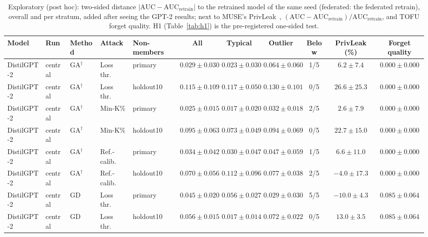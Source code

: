 \begin{table}[t]
\centering
\caption{Exploratory (post hoc): two-sided distance $|\mathrm{AUC}-\mathrm{AUC}_{\mathrm{retrain}}|$ to the retrained model of the same seed (federated: the federated retrain), overall and per stratum, added after seeing the GPT-2 results; next to MUSE's PrivLeak~\cite{shi2024muse}, $(\mathrm{AUC}-\mathrm{AUC}_{\mathrm{retrain}})/\mathrm{AUC}_{\mathrm{retrain}}$, and TOFU forget quality. H1 (Table~\ref{tab:h1}) is the pre-registered one-sided test.}
\label{tab:h1-two-sided}
\footnotesize
\renewcommand{\arraystretch}{1.2}
\setlength{\tabcolsep}{2pt}
\begin{tabular*}{\textwidth}{@{\extracolsep{\fill}}lllllcccccc@{}}
\toprule
\textbf{Model} & \textbf{Run} & \textbf{Method} & \textbf{Attack} & \textbf{Non-members} & \textbf{All} & \textbf{Typical} & \textbf{Outlier} & \textbf{Below} & \textbf{PrivLeak (\%)} & \textbf{Forget quality} \\
\midrule
DistilGPT-2 & central & GA$^{\dagger}$ & Loss thr. & primary & $0.029 \pm 0.030$ & $0.023 \pm 0.030$ & $0.064 \pm 0.060$ & 1/5 & $6.2 \pm 7.4$ & $0.000 \pm 0.000$ \\
DistilGPT-2 & central & GA$^{\dagger}$ & Loss thr. & holdout10 & $0.115 \pm 0.109$ & $0.117 \pm 0.050$ & $0.130 \pm 0.101$ & 0/5 & $26.6 \pm 25.3$ & $0.000 \pm 0.000$ \\
DistilGPT-2 & central & GA$^{\dagger}$ & Min-K\% & primary & $0.025 \pm 0.015$ & $0.017 \pm 0.020$ & $0.032 \pm 0.018$ & 2/5 & $2.6 \pm 7.9$ & $0.000 \pm 0.000$ \\
DistilGPT-2 & central & GA$^{\dagger}$ & Min-K\% & holdout10 & $0.095 \pm 0.063$ & $0.073 \pm 0.049$ & $0.094 \pm 0.069$ & 0/5 & $22.7 \pm 15.0$ & $0.000 \pm 0.000$ \\
DistilGPT-2 & central & GA$^{\dagger}$ & Ref.-calib. & primary & $0.034 \pm 0.042$ & $0.030 \pm 0.047$ & $0.047 \pm 0.059$ & 1/5 & $6.6 \pm 11.0$ & $0.000 \pm 0.000$ \\
DistilGPT-2 & central & GA$^{\dagger}$ & Ref.-calib. & holdout10 & $0.070 \pm 0.056$ & $0.112 \pm 0.096$ & $0.077 \pm 0.038$ & 2/5 & $-4.0 \pm 17.3$ & $0.000 \pm 0.000$ \\
DistilGPT-2 & central & GD & Loss thr. & primary & $0.045 \pm 0.020$ & $0.056 \pm 0.027$ & $0.029 \pm 0.030$ & 5/5 & $-10.0 \pm 4.3$ & $0.085 \pm 0.064$ \\
DistilGPT-2 & central & GD & Loss thr. & holdout10 & $0.056 \pm 0.015$ & $0.017 \pm 0.014$ & $0.072 \pm 0.022$ & 0/5 & $13.0 \pm 3.5$ & $0.085 \pm 0.064$ \\

\end{tabular*}
\end{table}
